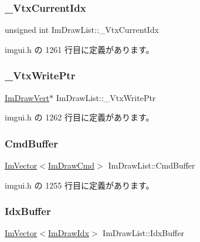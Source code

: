 \subsubsection{\texorpdfstring{\+\_\+\+Vtx\+Current\+Idx}{\_VtxCurrentIdx}}
{\footnotesize\ttfamily unsigned int Im\+Draw\+List\+::\+\_\+\+Vtx\+Current\+Idx}



 imgui.\+h の 1261 行目に定義があります。

\mbox{\label{struct_im_draw_list_a67f870f5140bf1cab14b8515b7386073}} 
\subsubsection{\texorpdfstring{\+\_\+\+Vtx\+Write\+Ptr}{\_VtxWritePtr}}
{\footnotesize\ttfamily \mbox{\hyperlink{struct_im_draw_vert}{Im\+Draw\+Vert}}$\ast$ Im\+Draw\+List\+::\+\_\+\+Vtx\+Write\+Ptr}



 imgui.\+h の 1262 行目に定義があります。

\mbox{\label{struct_im_draw_list_a67a4b5cc4c83bc3b81d96c46cbd38a07}} 
\subsubsection{\texorpdfstring{Cmd\+Buffer}{CmdBuffer}}
{\footnotesize\ttfamily \mbox{\hyperlink{class_im_vector}{Im\+Vector}}$<$\mbox{\hyperlink{struct_im_draw_cmd}{Im\+Draw\+Cmd}}$>$ Im\+Draw\+List\+::\+Cmd\+Buffer}



 imgui.\+h の 1255 行目に定義があります。

\mbox{\label{struct_im_draw_list_adf292ff70a954d82daf061c609e75dfc}} 
\subsubsection{\texorpdfstring{Idx\+Buffer}{IdxBuffer}}
{\footnotesize\ttfamily \mbox{\hyperlink{class_im_vector}{Im\+Vector}}$<$\mbox{\hyperlink{imgui_8h_afdc8744a5ac1a968b1ddfa47e13b2fa1}{Im\+Draw\+Idx}}$>$ Im\+Draw\+List\+::\+Idx\+Buffer}



